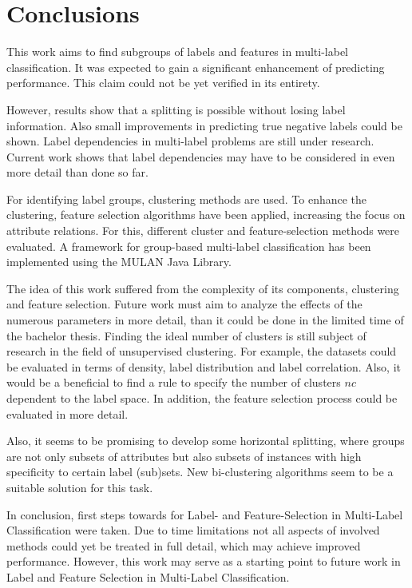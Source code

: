 \chapter{Conclusions}
\label{chapter:Conclusions}

	This work aims to find subgroups of labels and features in multi-label classification. It was expected to gain a significant enhancement of predicting performance. This claim could not be yet verified in its entirety.

	However, results show that a splitting is possible without losing label information. Also small improvements in predicting true negative labels could be shown. Label dependencies in multi-label problems are still under research. Current work \cite{cheng10icmlmld} shows that label dependencies may have to be considered in even more detail than done so far.

	For identifying label groups, clustering methods are used. To enhance the clustering, feature selection algorithms have been applied, increasing the focus on attribute relations. For this, different cluster and feature-selection methods were evaluated. A framework for group-based multi-label classification has been implemented using the MULAN Java Library.

	The idea of this work suffered from the complexity of its components, clustering and feature selection. Future work must aim to analyze the effects of the numerous parameters in more detail, than it could be done in the limited time of the bachelor thesis. Finding the ideal number of clusters is still subject of research in the field of unsupervised clustering. For example, the datasets could be evaluated in terms of density, label distribution and label correlation. Also, it would be a  beneficial to find a rule to specify the number of clusters $nc$ dependent to the label space. In addition, the feature selection process could be evaluated in more detail.

	Also, it seems to be promising to develop some horizontal splitting, where groups are not only subsets of attributes but also subsets of instances with high specificity to certain label (sub)sets. New bi-clustering algorithms seem to be a suitable solution for this task.

	In conclusion, first steps towards for Label- and Feature-Selection in Multi-Label Classification were taken. Due to time limitations not all aspects of involved methods could yet be treated in full detail, which may achieve improved performance. However, this work may serve as a starting point to future work in Label and Feature Selection in Multi-Label Classification.